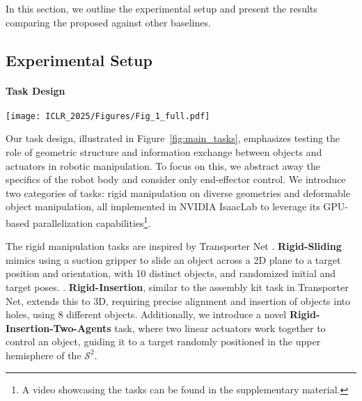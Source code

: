 In this section, we outline the experimental setup and present the results comparing the proposed \model against other baselines.

\subsection{Experimental Setup}
\label{sec:exp_setup}

\paragraph{Task Design}

\begin{figure*}[t]
    \centering
    \texttt{[image: ICLR\_2025/Figures/Fig\_1\_full.pdf]}
    \caption{Illustration of our diverse and challenging manipulation tasks, involving both rigid and deformable objects. These tasks require precise control under complex geometric constraints, coordination between multiple actuators, and handling of intricate interactions between objects and actuators. The variety of tasks highlights the need for policies that can understand the geometric structure in large observation and action spaces.
    }
    \label{fig:main_tasks}
\end{figure*}

Our task design, illustrated in Figure~\ref{fig:main_tasks}, emphasizes testing the role of geometric structure and information exchange between objects and actuators in robotic manipulation. To focus on this, we abstract away the specifics of the robot body and consider only end-effector control. We introduce two categories of tasks: rigid manipulation on diverse geometries and deformable object manipulation, all implemented in NVIDIA IsaacLab \citep{mittal2023orbit} to leverage its GPU-based parallelization capabilities\footnote{A video showcasing the tasks can be found in the supplementary material.}. 

The rigid manipulation tasks are inspired by Transporter Net \citep{zeng2020transporter}. \textbf{Rigid-Sliding} mimics using a suction gripper to slide an object across a 2D plane to a target position and orientation, with 10 distinct objects, and randomized initial and target poses. . \textbf{Rigid-Insertion}, similar to the assembly kit task in Transporter Net, extends this to 3D, requiring precise alignment and insertion of objects into holes, using $8$ different objects. Additionally, we introduce a novel \textbf{Rigid-Insertion-Two-Agents} task, where two linear actuators work together to control an object, guiding it to a target randomly positioned in the upper hemisphere of the $\mathcal{S}^2$.

